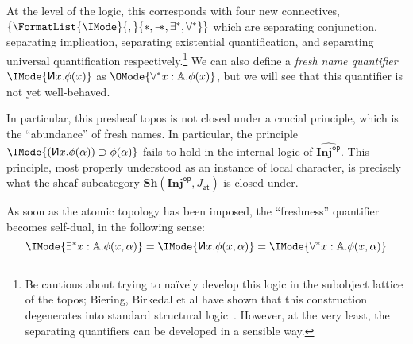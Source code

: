\documentclass{article}
\newcommand\OpCat[1]{{{#1}^{\mathsf{op}}}}
\newcommand\Psh[1]{\widehat{#1}}
\newcommand\Sh[1]{\mathbf{Sh} (#1)}
\newcommand\JAtomic{J_{\mathsf{at}}}
\newcommand\INJ{\mathbf{Inj}}
\newcommand\magicwand{\mathrel{-\mkern-6mu*}}
\newcommand\newname{\reflectbox{\ensuremath{\mathsf{N}}}}
\newcommand\MkSet[1]{\{#1\}}
\begin{document}
At the level of the logic, this corresponds with four new connectives,
$\MkSet{\FormatList{\IMode}{,}{*,\magicwand,\exists^*,\forall^*}}$
which are separating conjunction, separating implication, separating
existential quantification, and separating universal quantification
respectively.\footnote{Be cautious about trying to na\"ively develop
  this logic in the subobject lattice of the topos; Biering, Birkedal
  et al have shown that this construction degenerates into standard
  structural logic~\cite{biering-birkedal-torp-smith:2007}. However,
  at the very least, the separating quantifiers can be developed in a
  sensible way.}  We can also define a \emph{fresh name quantifier}
$\IMode{\newname x.\phi(x)}$ as
$\OMode{\forall^*x:\mathbb{A}.\phi(x)}$, but we will see that this
quantifier is not yet well-behaved.

In particular, this presheaf topos is not closed under a crucial
principle, which is the ``abundance'' of fresh names. In particular,
the principle $\IMode{(\newname x.\phi(\alpha))\supset\phi(\alpha)}$
fails to hold in the internal logic of $\Psh{\OpCat{\INJ}}$. This
principle, most properly understood as an instance of local character,
is precisely what the sheaf subcategory $\Sh{\OpCat{\INJ},\JAtomic}$
is closed under.

As soon as the atomic topology has been imposed, the ``freshness''
quantifier becomes self-dual, in the following sense:
\[
  \IMode{\exists^*x:\mathbb{A}.\phi(x,\alpha)}
  =
  \IMode{\newname x.\phi(x,\alpha)}
  =
  \IMode{\forall^*x:\mathbb{A}.\phi(x,\alpha)}
\]
\end{document}
